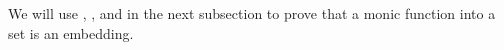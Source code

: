 \begin{code}
\>[2]%
\>[10]\AgdaSpace{}%
\AgdaSpace{}%
\<%
\\
%
\\[\AgdaEmptyExtraSkip]%
%
\>[1]\AgdaSpace{}%
\AgdaSymbol{(}\AgdaSpace{}%
\AgdaSymbol{\{}\AgdaSpace{}%
\AgdaSymbol{=}\AgdaSpace{}%
\AgdaSymbol{\}}\AgdaSpace{}%
\AgdaOperator{\AgdaInductiveConstructor{,}}\AgdaSpace{}%
\AgdaSpace{}%
\AgdaSymbol{\{}\AgdaSpace{}%
\AgdaSymbol{=}\AgdaSpace{}%
\AgdaSymbol{\})}\AgdaSpace{}%
\AgdaSymbol{=}\AgdaSpace{}%
\AgdaSpace{}%
\AgdaSymbol{\{}\AgdaSpace{}%
\AgdaSymbol{=}\AgdaSpace{}%
\AgdaSymbol{(}\AgdaSpace{}%
\AgdaOperator{\AgdaInductiveConstructor{,}}\AgdaSpace{}%
\AgdaSymbol{)\}}\<%
\end{code}
\ccpad
We will use , , and  in the next subsection to prove that a monic function into a set is an embedding.

